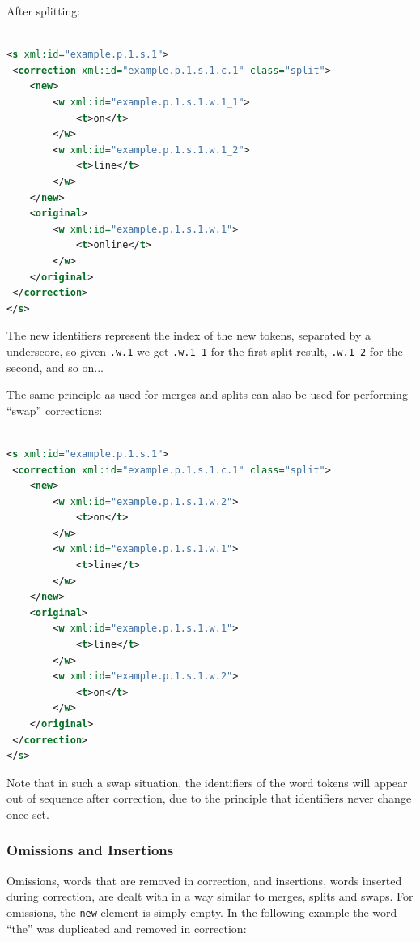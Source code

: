 \documentclass[a4paper,12pt]{report}
\begin{document}
After splitting:

\begin{lstlisting}[language=xml]

<s xml:id="example.p.1.s.1">
 <correction xml:id="example.p.1.s.1.c.1" class="split">
    <new>    
        <w xml:id="example.p.1.s.1.w.1_1">
            <t>on</t>
        </w>
        <w xml:id="example.p.1.s.1.w.1_2">
            <t>line</t>
        </w>                        
    </new>
    <original>
        <w xml:id="example.p.1.s.1.w.1">
            <t>online</t>
        </w>
    </original>
 </correction>               
</s>
\end{lstlisting}

The new identifiers represent the index of the new tokens, separated by a underscore, so given \texttt{.w.1}  we get \texttt{.w.1\_1} for the first split result, \texttt{.w.1\_2} for the second, and so on...

The same principle as used for merges and splits can also be used for performing ``swap'' corrections:

\begin{lstlisting}[language=xml]

<s xml:id="example.p.1.s.1">
 <correction xml:id="example.p.1.s.1.c.1" class="split">
    <new>    
        <w xml:id="example.p.1.s.1.w.2">
            <t>on</t>
        </w>
        <w xml:id="example.p.1.s.1.w.1">
            <t>line</t>
        </w>
    </new>
    <original>
        <w xml:id="example.p.1.s.1.w.1">
            <t>line</t>
        </w>
        <w xml:id="example.p.1.s.1.w.2">
            <t>on</t>
        </w>
    </original>
 </correction>               
</s>
\end{lstlisting}

Note that in such a swap situation, the identifiers of the word tokens will appear out of sequence after correction, due to the principle that identifiers never change once set.


\subsubsection{Omissions and Insertions}

Omissions, words that are removed in correction, and insertions, words inserted during correction, are dealt with in a way similar to merges, splits and swaps. For omissions, the \texttt{new} element is simply empty. In the following example the word ``the'' was duplicated and removed in correction:
\end{document}
